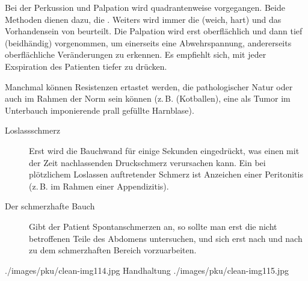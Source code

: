{Bei der Perkussion und Palpation wird quadrantenweise
vorgegangen. Beide Methoden dienen dazu, die . Weiters wird immer die 
(weich, hart) und das Vorhandensein von 
beurteilt. Die Palpation wird erst oberflächlich und dann
tief (beidhändig) vorgenommen, um einerseits eine
Abwehrspannung, andererseits oberflächliche Veränderungen zu
erkennen.   Es empfiehlt sich, mit jeder
Exspiration des Patienten tiefer zu drücken.

Manchmal können Resistenzen ertastet werden, die pathologischer Natur
oder auch im Rahmen der Norm sein können (z.\,B. 
(Kotballen), eine als Tumor im Unterbauch imponierende
prall gefüllte Harnblase). 

\begin{description}
  \item[Loslassschmerz]
Erst wird die Bauchwand für einige Sekunden eingedrückt, was einen
mit der Zeit nachlassenden Druckschmerz verursachen kann. Ein bei
plötzlichem Loslassen auftretender Schmerz ist Anzeichen einer
Peritonitis (z.\,B. im Rahmen einer Appendizitis). 
\item[Der schmerzhafte Bauch]
Gibt der
Patient Spontanschmerzen an, so sollte man erst die
nicht betroffenen Teile des Abdomens untersuchen, und sich
erst nach und nach zu dem schmerzhaften Bereich
vorzuarbeiten.
\end{description}



}{}{}{}{}


\begin{PictureSeries}{}{}
{./images/pku/clean-img114.jpg}
{Handhaltung}
{./images/pku/clean-img115.jpg}
{}
{}
{}
{}
{}
\end{PictureSeries}

